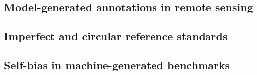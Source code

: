 \documentclass{elektr}
\begin{document}
\subsection*{Model-generated annotations in remote sensing}

\subsection*{Imperfect and circular reference standards}

\subsection*{Self-bias in machine-generated benchmarks}
\end{document}
